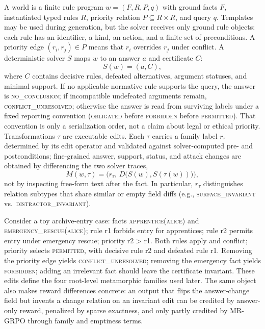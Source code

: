 \documentclass[letterpaper]{article}
\newcommand{\method}{MR-GRPO}
\newcommand{\lab}[1]{\textsc{#1}}
\begin{document}
A world is a finite rule program $w=(F,R,P,q)$ with ground facts $F$, instantiated typed rules $R$, priority relation $P\subseteq R\times R$, and query $q$. Templates may be used during generation, but the solver receives only ground rule objects: each rule has an identifier, a kind, an action, and a finite set of preconditions. A priority edge $(r_i,r_j)\in P$ means that $r_i$ overrides $r_j$ under conflict. A deterministic solver $S$ maps $w$ to an answer $a$ and certificate $C$:
\begin{equation}
S(w)=(a,C),
\end{equation}
where $C$ contains decisive rules, defeated alternatives, argument statuses, and minimal support. If no applicable normative rule supports the query, the answer is \lab{no\_conclusion}; if incompatible undefeated arguments remain, \lab{conflict\_unresolved}; otherwise the answer is read from surviving labels under a fixed reporting convention (\lab{obligated} before \lab{forbidden} before \lab{permitted}). That convention is only a serialization order, not a claim about legal or ethical priority. Transformations $\tau$ are executable edits. Each $\tau$ carries a family label $r_{\tau}$ determined by its edit operator and validated against solver-computed pre- and postconditions; fine-grained answer, support, status, and attack changes are obtained by differencing the two solver traces,
\begin{equation}
M(w,\tau)=\big(r_{\tau},\,D\big(S(w),S(\tau(w))\big)\big),
\end{equation}
not by inspecting free-form text after the fact. In particular, $r_{\tau}$ distinguishes relation subtypes that share similar or empty field diffs (e.g., \lab{surface\_invariant} vs.\ \lab{distractor\_invariant}).

Consider a toy archive-entry case: facts \lab{apprentice(alice)} and \lab{emergency\_rescue(alice)}; rule r1 forbids entry for apprentices; rule r2 permits entry under emergency rescue; priority r2 > r1. Both rules apply and conflict; priority selects \lab{permitted}, with decisive rule r2 and defeated rule r1. Removing the priority edge yields \lab{conflict\_unresolved}; removing the emergency fact yields \lab{forbidden}; adding an irrelevant fact should leave the certificate invariant. These edits define the four root-level metamorphic families used later. The same object also makes reward differences concrete: an output that flips the answer-change field but invents a change relation on an invariant edit can be credited by answer-only reward, penalized by sparse exactness, and only partly credited by \method{} through family and emptiness terms.
\end{document}

